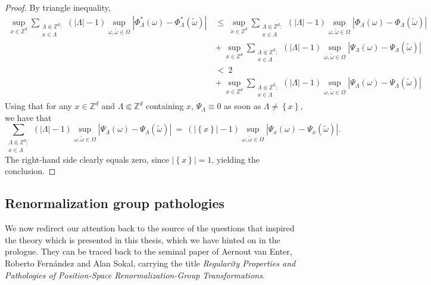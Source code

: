 \documentclass[12pt]{article}
\newcommand{\Z}{\mathbb{Z}}
\newcommand{\set}[1]{\left\{#1\right\}}
\newcommand{\1}{\mathbbm{1}}
\newcommand{\5}{\vspace{0.5cm}}
\renewcommand{\tilde}{\widetilde}
\theoremstyle{definition}
\begin{document}
\begin{proof}
By triangle inequality,
\begin{align*}
\sup_{x\in\Z^d}\sum_{\substack{\Lambda\Subset\Z^d:\\x\in\Lambda}}(|\Lambda|-1)\sup_{\omega,\tilde{\omega}\in\Omega}|\Phi_\Lambda^*(\omega)-\Phi_\Lambda^*(\tilde{\omega})| ~&\leq~ \sup_{x\in\Z^d}\sum_{\substack{\Lambda\Subset\Z^d:\\x\in\Lambda}}(|\Lambda|-1)\sup_{\omega,\tilde{\omega}\in\Omega}|\Phi_\Lambda(\omega)-\Phi_\Lambda(\tilde{\omega})| \\
&+~ \sup_{x\in\Z^d}\sum_{\substack{\Lambda\Subset\Z^d:\\x\in\Lambda}}(|\Lambda|-1)\sup_{\omega,\tilde{\omega}\in\Omega}|\Psi_\Lambda(\omega)-\Psi_\Lambda(\tilde{\omega})| \\
&<~ 2 \\
&+~ \sup_{x\in\Z^d}\sum_{\substack{\Lambda\Subset\Z^d:\\x\in\Lambda}}(|\Lambda|-1)\sup_{\omega,\tilde{\omega}\in\Omega}|\Psi_\Lambda(\omega)-\Psi_\Lambda(\tilde{\omega})|
\end{align*}
Using that for any $x\in\Z^d$ and $\Lambda\Subset\Z^d$ containing $x$, $\Psi_\Lambda\equiv 0$ as soon as $\Lambda\neq\set{x}$, we have that
$$\sum_{\substack{\Lambda\Subset\Z^d:\\x\in\Lambda}}(|\Lambda|-1)\sup_{\omega,\tilde{\omega}\in\Omega}|\Psi_\Lambda(\omega)-\Psi_\Lambda(\tilde{\omega})| ~=~ (|\!\set{x}\!|-1)\sup_{\omega,\tilde{\omega}\in\Omega}|\Psi_x(\omega)-\Psi_x(\tilde{\omega})|.$$
The right-hand side clearly equals zero, since $|\!\set{x}\!|=1$, yielding the conclusion.
\end{proof} 


\subsection{Renormalization group pathologies}

We now redirect our attention back to the source of the questions that inspired the theory which is presented in this thesis, which we have hinted on in the prologue. They can be traced back to the seminal paper of Aernout van Enter, Roberto Fern\'andez and Alan Sokal, carrying the title \textit{Regularity Properties and Pathologies of Position-Space Renormalization-Group Transformations}. \\
\end{document}
